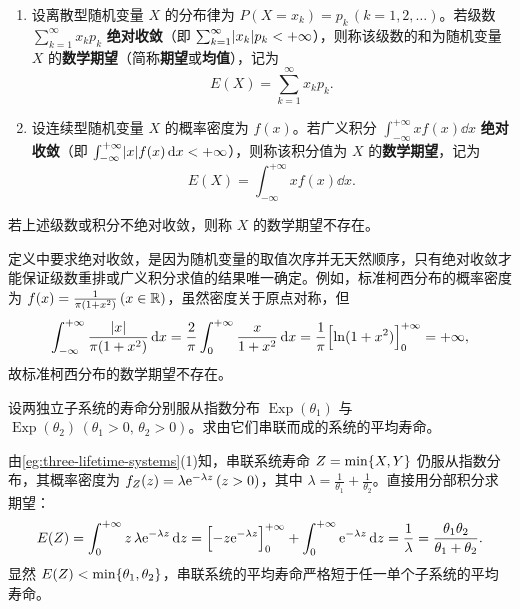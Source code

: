 \begin{definition}[数学期望]
\label{def:expectation}
\begin{enumerate}
  \item 设离散型随机变量 $X$ 的分布律为 $P(X=x_k)=p_k\,(k=1,2,\ldots)$。若级数 $\sum_{k=1}^{\infty}x_k p_k$ \textbf{绝对收敛}（即 $\sum_{k=1}^{\infty}\lvert x_k\rvert p_k<+\infty$），则称该级数的和为随机变量 $X$ 的\textbf{数学期望}（简称\textbf{期望}或\textbf{均值}），记为
  \begin{equation}
    E(X)=\sum_{k=1}^{\infty}x_k p_k.
    \label{eq:expectation-discrete}
  \end{equation}
  \item 设连续型随机变量 $X$ 的概率密度为 $f(x)$。若广义积分 $\int_{-\infty}^{+\infty}x f(x)\dd x$ \textbf{绝对收敛}（即 $\int_{-\infty}^{+\infty}\lvert x\rvert f(x)\mathop{}\!\mathrm{d} x<+\infty$），则称该积分值为 $X$ 的\textbf{数学期望}，记为
  \begin{equation}
    E(X)=\int_{-\infty}^{+\infty}x f(x)\dd x.
    \label{eq:expectation-continuous}
  \end{equation}
\end{enumerate}
若上述级数或积分不绝对收敛，则称 $X$ 的数学期望不存在。
\end{definition}

定义中要求绝对收敛，是因为随机变量的取值次序并无天然顺序，只有绝对收敛才能保证级数重排或广义积分求值的结果唯一确定。例如，标准柯西分布的概率密度为 $f(x)=\frac{1}{\pi(1+x^2)}\,(x\in\mathbb{R})$，虽然密度关于原点对称，但
\[
  \int_{-\infty}^{+\infty}\frac{\lvert x\rvert}{\pi(1+x^2)}\mathop{}\!\mathrm{d} x
  =\frac{2}{\pi}\int_{0}^{+\infty}\frac{x}{1+x^2}\mathop{}\!\mathrm{d} x
  =\frac{1}{\pi}\Bigl[\ln(1+x^2)\Bigr]_{0}^{+\infty}=+\infty,
\]
故标准柯西分布的数学期望不存在。

\begin{example}[title={串联系统的平均寿命}]
\label{eg:series-mean-lifetime}
设两独立子系统的寿命分别服从指数分布 $\operatorname{Exp}(\theta_1)$ 与 $\operatorname{Exp}(\theta_2)\,(\theta_1>0,\,\theta_2>0)$。求由它们串联而成的系统的平均寿命。
\begin{solution}
由\cref{eg:three-lifetime-systems}(1)知，串联系统寿命 $Z=\min\{X,Y\}$ 仍服从指数分布，其概率密度为 $f_Z(z)=\lambda\mathrm{e}^{-\lambda z}\,(z>0)$，其中 $\lambda=\frac{1}{\theta_1}+\frac{1}{\theta_2}$。直接用分部积分求期望：
\[
  E(Z)=\int_{0}^{+\infty}z\,\lambda\mathrm{e}^{-\lambda z}\mathop{}\!\mathrm{d} z
  =\Bigl[-z\mathrm{e}^{-\lambda z}\Bigr]_{0}^{+\infty}+\int_{0}^{+\infty}\mathrm{e}^{-\lambda z}\mathop{}\!\mathrm{d} z
  =\frac{1}{\lambda}=\frac{\theta_1\theta_2}{\theta_1+\theta_2}.
\]
显然 $E(Z)<\min\{\theta_1,\theta_2\}$，串联系统的平均寿命严格短于任一单个子系统的平均寿命。
\end{solution}
\end{example}

